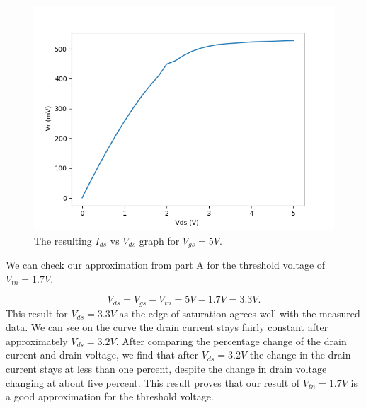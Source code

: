 		\begin{figure}[h!]
		\centering
		\includegraphics[scale=0.75]{../data/nmos_5v.png}
		\caption{The resulting $I_{ds}$ vs $V_{ds}$ graph for $V_{gs}=5V$.}
		\label{fig:nmos_5v}
		\end{figure}

		\FloatBarrier
		We can check our approximation from part A for the threshold voltage of $V_{tn} = 1.7 V$.
		
\begin{equation}
	\label{eq:thresh_5V}
		V_{ds} = V_{gs} - V_{tn} = 5 V - 1.7 V = 3.3 V.	
\end{equation}
This result for $V_{ds} = 3.3 V$ as the edge of saturation agrees well with the measured data. 
We can see on the curve the drain current stays fairly constant after approximately $V_{ds}=3.2 V$.
After comparing the percentage change of the drain current and drain voltage, we find that after $V_{ds} = 3.2 V$ the change in the drain current stays at less than one percent, despite the change in drain voltage changing at about five percent. 
This result proves that our result of $V_{tn} = 1.7 V$ is a good approximation for the threshold voltage.
